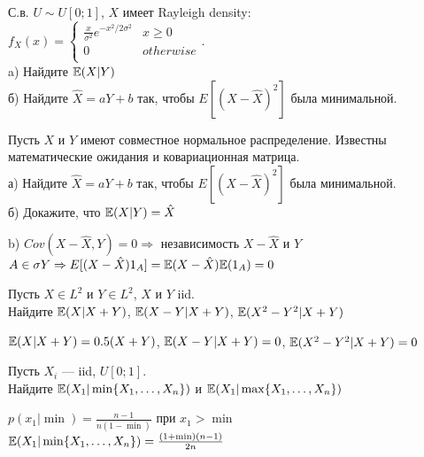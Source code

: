 \begin{solution}
\begin{solution}
\begin{solution}
\begin{solution}
\begin{solution}
\begin{solution}
\begin{solution}
\begin{problem}
С.в. $U\sim U[0;1]$, $X$ имеет Rayleigh density: \\
$f_{X}(x)=
\begin{cases}
  \frac{x}{\sigma^{2}}e^{-x^{2}/2\sigma^{2}} & x\ge 0 \\
  0 & otherwise \\
\end{cases}$. \\
a) Найдите $\mathbb{E}(X|Y)$ \\
б) Найдите $\hat{X}=aY+b$ так, чтобы $E[(X-\hat{X})^{2}]$ была
минимальной. 
\end{problem} 
\begin{solution} 

\end{solution}

\begin{problem}
Пусть $X$ и $Y$ имеют совместное нормальное распределение.
Известны математические ожидания и ковариационная матрица. \\
а) Найдите $\hat{X}=aY+b$ так, чтобы $E[(X-\hat{X})^{2}]$ была
минимальной. \\
б) Докажите, что $\mathbb{E}(X|Y)=\hat{X}$ 
\end{problem} 
\begin{solution} 


b) $Cov(X-\hat{X},Y)=0 \Rightarrow $ независимость $X-\hat{X}$ и
$Y$ \\
$A\in\sigma{Y} \Rightarrow
E[(X-\hat{X})1_{A}]=\mathbb{E}(X-\hat{X})\mathbb{E}(1_{A})=0$ 
\end{solution}

\begin{problem}
Пусть $X\in L^{2}$ и $Y\in L^{2}$, $X$ и $Y$ iid. \\
Найдите $\mathbb{E}(X|X+Y)$, $\mathbb{E}(X-Y|X+Y)$, $\mathbb{E}(X^{2}-Y^{2}|X+Y)$ 
\end{problem} 
\begin{solution} 

$\mathbb{E}(X|X+Y)=0.5(X+Y)$, $\mathbb{E}(X-Y|X+Y)=0$, $\mathbb{E}(X^{2}-Y^{2}|X+Y)=0$ 
\end{solution}

\begin{problem}
Пусть $X_{i}$ --- iid, $U[0;1]$. \\
Найдите $\mathbb{E}(X_{1}|\min\{X_{1},\ldots,X_{n}\})$ и
$\mathbb{E}(X_{1}|\max\{X_{1},\ldots,X_{n}\})$ 
\end{problem} 
\begin{solution} 

$p(x_{1}|\min)=\frac{n-1}{n(1-\min)}$ при $x_{1}>\min$ \\
$\mathbb{E}(X_{1}|\min\{X_{1},\ldots,X_{n}\})=\frac{(1+\min)(n-1)}{2n}$ 
\end{solution}


\end{solution}
\end{solution}
\end{solution}
\end{solution}
\end{solution}
\end{solution}
\end{solution}
